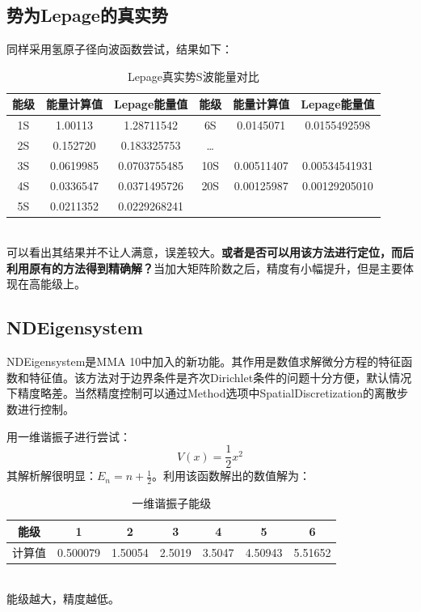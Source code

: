\documentclass[hyperref]{ctexart}
\begin{document}
\subsection{势为Lepage的真实势}
同样采用氢原子径向波函数尝试，结果如下：
\begin{table}[!htb]
  \centering
  \begin{tabular}{|cccccc|}
    \hline
    能级 & 能量计算值 & Lepage能量值 & 能级 & 能量计算值 & Lepage能量值 \\
    \hline
    1S & 1.00113 & 1.28711542 & 6S & 0.0145071 & 0.0155492598 \\
    2S & 0.152720 & 0.183325753  & \dots &   & \\
    3S & 0.0619985 & 0.0703755485 & 10S & 0.00511407 & 0.00534541931 \\
    4S & 0.0336547 & 0.0371495726 & 20S & 0.00125987 & 0.00129205010 \\
    5S & 0.0211352 & 0.0229268241  &  &  &  \\
    \hline
  \end{tabular}
  \caption{Lepage真实势S波能量对比}
\end{table}\\
可以看出其结果并不让人满意，误差较大。\textbf{或者是否可以用该方法进行定位，而后利用原有的方法得到精确解？}当加大矩阵阶数之后，精度有小幅提升，但是主要体现在高能级上。

\subsection{NDEigensystem}
NDEigensystem是MMA 10中加入的新功能。其作用是数值求解微分方程的特征函数和特征值。该方法对于边界条件是齐次Dirichlet条件的问题十分方便，默认情况下精度略差。当然精度控制可以通过Method选项中SpatialDiscretization的离散步数进行控制。

用一维谐振子进行尝试：
\begin{equation}\label{HarmonicOscillator}
  V(x)=\frac{1}{2}x^2
\end{equation}
其解析解很明显：$\displaystyle E_n=n+\frac{1}{2}$。利用该函数解出的数值解为：
\begin{table}[!htdp]
  \centering
  \begin{tabular}{|c|c|c|c|c|c|c|}
    \hline
    能级 & 1 & 2 & 3 & 4 & 5 & 6 \\
    \hline
    计算值 & 0.500079 & 1.50054 & 2.5019 & 3.5047 & 4.50943 & 5.51652\\
    \hline
  \end{tabular}
  \caption{一维谐振子能级}
\end{table}\\
能级越大，精度越低。
\end{document}
